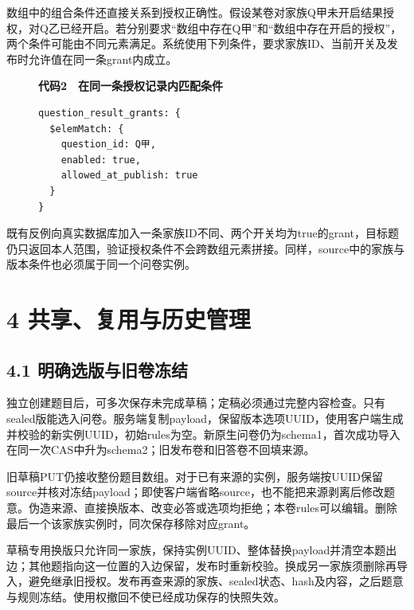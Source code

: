 数组中的组合条件还直接关系到授权正确性。假设某卷对家族Q甲未开启结果授权，对Q乙已经开启。若分别要求``数组中存在Q甲''和``数组中存在开启的授权''，两个条件可能由不同元素满足。系统使用下列条件，要求家族ID、当前开关及发布时允许值在同一条grant内成立。

\begin{figure}[t]
\centering\begin{minipage}{\linewidth}
\small\textbf{代码2　在同一条授权记录内匹配条件}\par\smallskip
\begin{Verbatim}[fontsize=\footnotesize,breaklines=true,breakanywhere=true,frame=single,framesep=5pt,rulecolor=\color{linkblue!45}]
question_result_grants: {
  $elemMatch: {
    question_id: Q甲,
    enabled: true,
    allowed_at_publish: true
  }
}
\end{Verbatim}
\end{minipage}\end{figure}

既有反例向真实数据库加入一条家族ID不同、两个开关均为true的grant，目标题仍只返回本人范围，验证授权条件不会跨数组元素拼接。同样，source中的家族与版本条件也必须属于同一个问卷实例。

\section{4 共享、复用与历史管理}\label{ux5171ux4eabux590dux7528ux4e0eux5386ux53f2ux7ba1ux7406}

\subsection{4.1 明确选版与旧卷冻结}\label{ux660eux786eux9009ux7248ux4e0eux65e7ux5377ux51bbux7ed3}

独立创建题目后，可多次保存未完成草稿；定稿必须通过完整内容检查。只有sealed版能选入问卷。服务端复制payload，保留版本选项UUID，使用客户端生成并校验的新实例UUID，初始rules为空。新原生问卷仍为schema1，首次成功导入在同一次CAS中升为schema2；旧发布卷和旧答卷不回填来源。

旧草稿PUT仍接收整份题目数组。对于已有来源的实例，服务端按UUID保留source并核对冻结payload；即使客户端省略source，也不能把来源剥离后修改题意。伪造来源、直接换版本、改变必答或选项均拒绝；本卷rules可以编辑。删除最后一个该家族实例时，同次保存移除对应grant。

草稿专用换版只允许同一家族，保持实例UUID、整体替换payload并清空本题出边；其他题指向这一位置的入边保留，发布时重新校验。换成另一家族须删除再导入，避免继承旧授权。发布再查来源的家族、sealed状态、hash及内容，之后题意与规则冻结。使用权撤回不使已经成功保存的快照失效。

